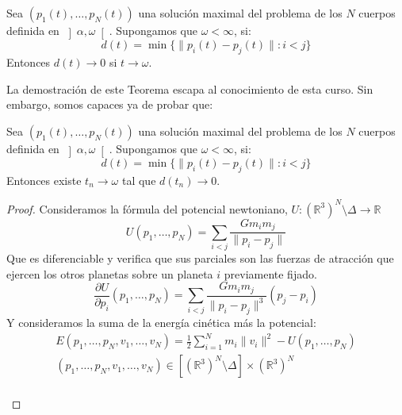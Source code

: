 \begin{teo}[de Painlevé]
    Sea $(p_1(t), \ldots, p_N(t))$ una solución maximal del problema de los $N$ cuerpos definida en $\left]\alpha,\omega\right[$. Supongamos que $\omega<\infty$, si:
    \begin{equation*}
        d(t) = \min \{\|p_i(t)- p_j(t)\| : i <j\}
    \end{equation*}
    Entonces $d(t)\to 0$ si $t\to \omega$.
\end{teo}

\noindent
La demostración de este Teorema escapa al conocimiento de esta curso. Sin embargo, somos capaces ya de probar que:

\begin{teo}
    Sea $(p_1(t), \ldots, p_N(t))$ una solución maximal del problema de los $N$ cuerpos definida en $\left]\alpha,\omega\right[$. Supongamos que $\omega<\infty$, si:
    \begin{equation*}
        d(t) = \min \{\|p_i(t)- p_j(t)\| : i <j\}
    \end{equation*}
    Entonces existe $t_n\to \omega$ tal que $d(t_n)\to 0$.
    \begin{proof}
        \noindent
        Consideramos la fórmula del potencial newtoniano, $U:{(\mathbb{R}^3)}^{N}\setminus \Delta\to \mathbb{R}$
        \begin{equation*}
            U(p_1,\ldots,p_N) = \sum_{i<j} \frac{Gm_im_j}{\|p_i-p_j\|}
        \end{equation*}
        Que es diferenciable y verifica que sus parciales son las fuerzas de atracción que ejercen los otros planetas sobre un planeta $i$ previamente fijado.
        \begin{equation*}
            \frac{\partial U}{\partial p_i}(p_1,\ldots,p_N) = \sum_{i<j} \frac{Gm_im_j}{\|p_i-p_j\|^3}(p_j-p_i)
        \end{equation*}
        Y consideramos la suma de la energía cinética más la potencial:
        \begin{multline*}
            E(p_1,\ldots,p_N,v_1,\ldots,v_N) = \frac{1}{2}\sum_{i=1}^{N}m_i\|v_i\|^2 - U(p_1,\ldots,p_N)\\ (p_1,\ldots,p_N,v_1,\ldots,v_N) \in [{(\mathbb{R}^3)}^{N}\setminus \Delta]\times {(\mathbb{R}^3)}^{N}
        \end{multline*}~\\


\end{proof}
\end{teo}
